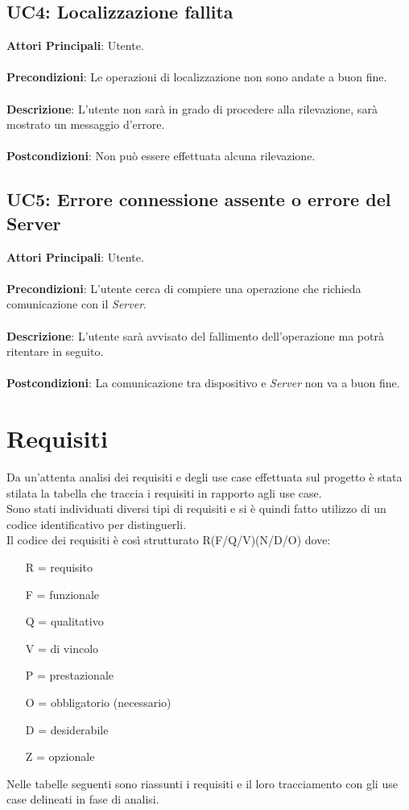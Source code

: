 \subsection{UC4: Localizzazione fallita}
\textbf{Attori Principali}: Utente.
\\\\ \textbf{Precondizioni}: Le operazioni di localizzazione non sono andate a buon fine.
\\\\ \textbf{Descrizione}: L'utente non sarà in grado di procedere alla rilevazione, sarà mostrato un messaggio d'errore.
\\\\ \textbf{Postcondizioni}: Non può essere effettuata alcuna rilevazione.


\subsection{UC5: Errore connessione assente o errore del Server}
\textbf{Attori Principali}: Utente.
\\\\ \textbf{Precondizioni}: L'utente cerca di compiere una operazione che richieda comunicazione con il \emph{Server}.
\\\\ \textbf{Descrizione}: L'utente sarà avvisato del fallimento dell'operazione ma potrà ritentare in seguito.
\\\\ \textbf{Postcondizioni}: La comunicazione tra dispositivo e \emph{Server} non va a buon fine.



\section{Requisiti}

Da un'attenta analisi dei requisiti e degli use case effettuata sul progetto è stata stilata la tabella che traccia i requisiti in rapporto agli use case.\\
Sono stati individuati diversi tipi di requisiti e si è quindi fatto utilizzo di un codice identificativo per distinguerli.\\
Il codice dei requisiti è così strutturato R(F/Q/V)(N/D/O) dove:
\begin{enumerate}
	\item[R =] requisito
	
    \item[F =] funzionale
    \item[Q =] qualitativo
    \item[V =] di vincolo
    \item[P =] prestazionale
    
    \item[O =] obbligatorio (necessario)
    \item[D =] desiderabile
    \item[Z =] opzionale
\end{enumerate}
Nelle tabelle seguenti sono riassunti i requisiti e il loro tracciamento con gli use case delineati in fase di analisi.

